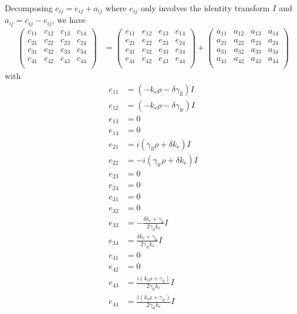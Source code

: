 Decomposing $c_{ij} = e_{ij} + a_{ij}$ where $e_{ij}$ only involves the identity transform $I$ and $a_{ij}=c_{ij}-e_{ij}$, we have
\begin{align*}
  \begin{pmatrix}
    c_{11} & c_{12} & c_{13} & c_{14} \\
    c_{21} & c_{22} & c_{23} & c_{24} \\
    c_{31} & c_{32} & c_{33} & c_{34} \\
    c_{41} & c_{42} & c_{43} & c_{44} \\
  \end{pmatrix} &=
  \begin{pmatrix}
    e_{11} & e_{12} & e_{13} & e_{14} \\
    e_{21} & e_{22} & e_{23} & e_{24} \\
    e_{31} & e_{32} & e_{33} & e_{34} \\
    e_{41} & e_{42} & e_{43} & e_{44} \\
  \end{pmatrix} + 
  \begin{pmatrix}
    a_{11} & a_{12} & a_{13} & a_{14} \\
    a_{21} & a_{22} & a_{23} & a_{24} \\
    a_{31} & a_{32} & a_{33} & a_{34} \\
    a_{41} & a_{42} & a_{43} & a_{44} \\
  \end{pmatrix} 
\end{align*}
with
\begin{align*}
  e_{11} &= \left(-k_\text{e} \rho-\delta \gamma_\text{il}\right) I\\
  e_{12} &= \left(-k_\text{e} \rho-\delta \gamma_\text{ir}\right) I\\
  e_{13} &= 0\\
  e_{14} &= 0\\
  e_{21} &= i \left(\gamma_\text{il} \rho+\delta k_\text{e}\right) I\\
  e_{22} &= -i (\gamma_\text{ir} \rho+\delta k_\text{e}) I\\
  e_{23} &= 0\\
  e_{24} &= 0\\
  e_{31} &= 0\\
  e_{32} &= 0\\
  e_{33} &= -\frac{\delta k_\text{e}+\gamma_\text{il}}{2 \gamma_\text{il} k_\text{e}}I\\
  e_{34} &= \frac{\delta k_\text{e}+\gamma_\text{ir}}{2 \gamma_\text{ir} k_\text{e}} I\\
  e_{41} &= 0\\
  e_{42} &= 0\\
  e_{43} &= \frac{i(k_\text{e} \rho + \gamma_\text{il})}{2 \gamma_\text{il} k_\text{e}} I\\
  e_{44} &= \frac{i(k_\text{e} \rho+ \gamma_\text{ir})}{2 \gamma_\text{ir} k_\text{e}} I
\end{align*}
